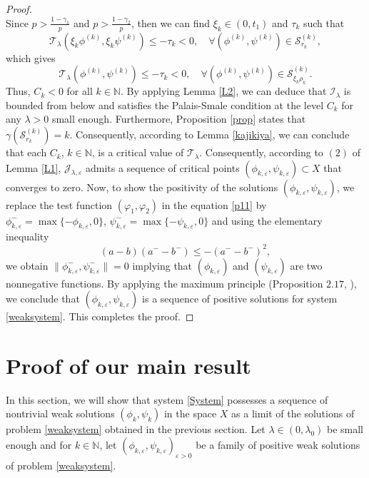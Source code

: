 \documentclass[10pt,a4paper]{amsart}
\numberwithin{equation}{section}
\begin{document}
\begin{proof}
$$$$
Since $p>\frac{1-\gamma_1}{p}$ and $p>\frac{1-\gamma_2}{p}$, then we can find 
$\xi_k\in (0,t_1)$ and $\tau_k$ such that
\[
\mathcal{T}_{\lambda}(\xi_k\phi^{(k)},\xi_k\psi^{(k)})\leq -\tau_k<0,\quad 
\forall (\phi^{(k)},\psi^{(k)})\in \mathscr{S}_{r_k}^{(k)}, 
\]
which gives
\[
\mathcal{T}_{\lambda}(\phi^{(k)},\psi^{(k)})\leq -\tau_k<0,\quad 
\forall (\phi^{(k)},\psi^{(k)})\in \mathscr{S}_{\xi_k\rho_k}^{(k)}.
\]
Thus, $C_k<0$ for all $k\in\mathbb{N}$. By applying Lemma \ref{L2}, we can deduce that 
$\mathcal{I}_\lambda$ is bounded from below and satisfies the Palais-Smale condition 
at the level $C_k$ for any $\lambda>0$ small enough. Furthermore, 
Proposition \ref{prop} states that $\gamma(\mathscr{S}_{r_k}^{(k)})=k$. 
Consequently, according to Lemma \ref{kajikiya}, we can conclude that each $C_k$, 
$k\in \mathbb{N}$, is a critical value of $\mathcal{T}_{\lambda}$. 
Consequently, according to $(2)$ of Lemma \ref{L1}, $\mathcal{J}_{\lambda,\varepsilon}$ 
admits a sequence of critical points 
$(\phi_{k,\varepsilon},\psi_{k,\varepsilon})\subset X$ that converges to zero. 
Now, to show the positivity of the solutions 
$(\phi_{k,\varepsilon},\psi_{k,\varepsilon})$, we replace the test function 
$(\varphi_1,\varphi_2)$ in the equation \eqref{p11} by 
$\phi_{k,\varepsilon}^-=\max\lbrace -\phi_{k,\varepsilon},0\rbrace$, 
$\psi_{k,\varepsilon}^-=\max\lbrace -\psi_{k,\varepsilon},0\rbrace$  and using the 
elementary inequality
$$
(a-b)(a^--b^-)\leq -(a^--b^-)^2, 
$$
we obtain $\| \phi_{k,\varepsilon}^-,\psi_{k,\varepsilon}^-\|=0$ implying that 
$(\phi_{k,\varepsilon})$ and $(\psi_{k,\varepsilon})$ are two nonnegative functions. 
By applying the maximum principle (Proposition $2.17$, \cite{max}), we conclude that 
$(\phi_{k,\varepsilon},\psi_{k,\varepsilon})$ is a sequence of positive solutions for 
system \eqref{weaksystem}. This completes the proof.
\end{proof}


\section{Proof of our main result}


In this section, we will show that system \eqref{System} possesses a sequence of 
nontrivial weak solutions $(\phi_k,\psi_k)$ in the space $X$ as a limit of the 
solutions of problem \eqref{weaksystem} obtained in the previous section. 
Let $\lambda\in (0,\lambda_0)$ be small enough and for $k\in\mathbb{N}$, 
let $(\phi_{k,\varepsilon},\psi_{k,\varepsilon})_{\varepsilon>0}$ be a family of
 positive weak solutions of problem \eqref{weaksystem}.
\smallskip
\end{document}
